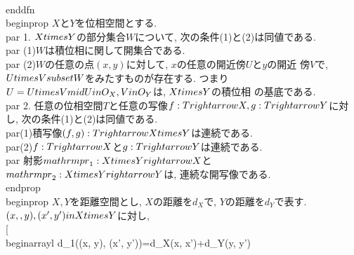 \\end{dfn}
\\begin{prop}
 $X$と$Y$を位相空間とする.
 \\par 1. $X\\times Y$の部分集合$W$について, 次の条件(1)と(2)は同値である.
 \\par (1)$W$は積位相に関して開集合である.
 \\par (2)$W$の任意の点$(x, y)$に対して, $x$の任意の開近傍$U$と$y$の開近
 傍$V$で, $U\\times V\\subset W$をみたすものが存在する. つまり
 $\\U=\\{U\\times V\\mid U\\in \\O_{X}, V\\in \\O_{Y}\\}$は, $X\\times Y$の積位相
 の基底である.
 \\par 2. 任意の位相空間$T$と任意の写像$f:T\\rightarrow X, g:T\\rightarrow
 Y$に対し, 次の条件(1)と(2)は同値である.
 \\par(1)積写像$(f, g):T\\rightarrow X\\times Y$は連続である.
 \\par(2)$f:T\\rightarrow X$と$g:T\\rightarrow Y$は連続である.
 \\par 射影$\\mathrm{pr}_{1}:X\\times Y\\rightarrow X$と
 $\\mathrm{pr}_{2}:X\\times Y\\rightarrow Y$は, 連続な開写像である.
\\end{prop}
\\begin{prop}
 $X, Y$を距離空間とし, $X$の距離を$d_{X}$で, $Y$の距離を$d_{Y}$で表す.
 $(x, , y), (x', y')\\in X\\times Y$に対し,
 \\[
  \\begin{array}{l}
   d_{1}((x, y), (x', y'))=d_{X}(x, x')+d_{Y}(y, y')\\\\
